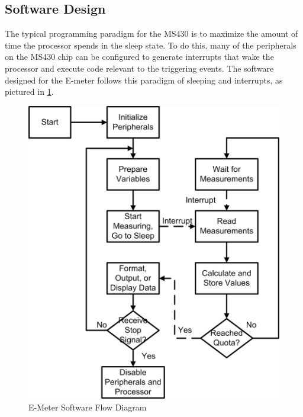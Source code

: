 \subsection{Software Design}

The typical programming paradigm for the MS430 is to
maximize the amount of time the processor spends in the sleep
state. To do this, many of the peripherals on the MS430 chip can be
configured to generate interrupts that wake the processor and execute
code relevant to the triggering events. The software designed for the
E-meter follows this paradigm of sleeping and interrupts, as pictured
in \ref{fig:emeter_software_flow}.

\begin{figure}[htbp]
\begin{center}
  \includegraphics[width=5in]{includes/Emeter_Software_Flowchart}
  \caption{E-Meter Software Flow Diagram}
  \label{fig:emeter_software_flow}
\end{center}
\end{figure}

